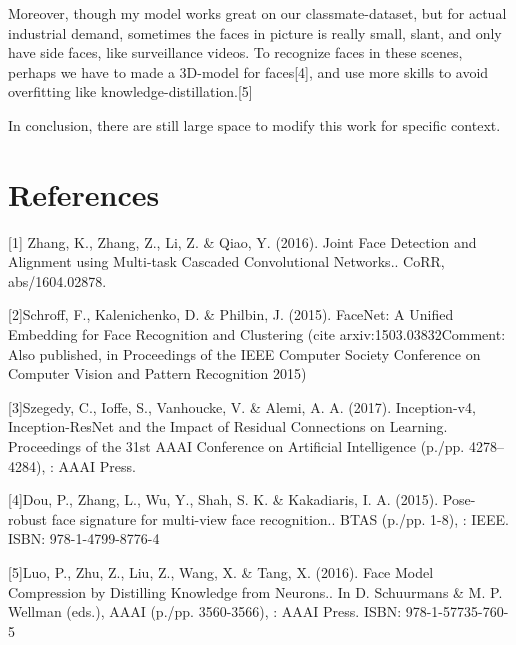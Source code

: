 \documentclass{article}
\begin{document}
Moreover, though my model works great on our classmate-dataset, but for actual industrial demand, sometimes the faces in picture is really small, slant, and only have side faces, like  surveillance videos. To recognize faces in these scenes, perhaps we have to made a 3D-model for faces[4], and use more skills to avoid overfitting like knowledge-distillation.[5]

In conclusion, there are still large space to modify this work for specific context.

\section*{References}


\medskip

\small

[1] Zhang, K., Zhang, Z., Li, Z. & Qiao, Y. (2016). Joint Face Detection and Alignment using Multi-task Cascaded Convolutional Networks.. CoRR, abs/1604.02878.

[2]Schroff, F., Kalenichenko, D. & Philbin, J. (2015). FaceNet: A Unified Embedding for Face Recognition and Clustering (cite arxiv:1503.03832Comment: Also published, in Proceedings of the IEEE Computer Society Conference on Computer Vision and Pattern Recognition 2015)

[3]Szegedy, C., Ioffe, S., Vanhoucke, V. & Alemi, A. A. (2017). Inception-v4, Inception-ResNet and the Impact of Residual Connections on Learning. Proceedings of the 31st AAAI Conference on Artificial Intelligence (p./pp. 4278--4284), : AAAI Press.

[4]Dou, P., Zhang, L., Wu, Y., Shah, S. K. & Kakadiaris, I. A. (2015). Pose-robust face signature for multi-view face recognition.. BTAS (p./pp. 1-8), : IEEE. ISBN: 978-1-4799-8776-4


[5]Luo, P., Zhu, Z., Liu, Z., Wang, X. & Tang, X. (2016). Face Model Compression by Distilling Knowledge from Neurons.. In D. Schuurmans & M. P. Wellman (eds.), AAAI (p./pp. 3560-3566), : AAAI Press. ISBN: 978-1-57735-760-5
\end{document}
